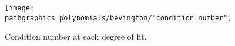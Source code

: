 \begin{figure}[t]
	\texttt{[image: \\pathgraphics polynomials/bevington/"condition number"]}
	\caption{Condition number at each degree of fit.}
\end{figure}

\endinput  %

